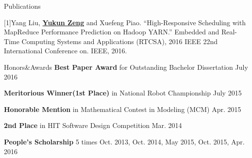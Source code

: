 \documentclass{resume} %
\begin{document}
\begin{rSection}{Publications}

{[1]Yang Liu, }\underline{\bf Yukun Zeng}{ and Xuefeng Piao. ``High-Responsive Scheduling with MapReduce Performance Prediction on Hadoop YARN.'' Embedded and Real-Time Computing Systems and Applications (RTCSA), 2016 IEEE 22nd International Conference on. IEEE, 2016.
}

\end{rSection}

\begin{rSection}{Honors\&Awards}
{\bf Best Paper Award}{ for Outstanding Bachelor Dissertation} \hfill {July 2016}
\vspace*{-0.4em}

{\bf Meritorious Winner(1st Place)}{ in National Robot Championship} \hfill {July 2015}
\vspace*{-0.4em}

{\bf Honorable Mention}{ in Mathematical Contest in Modeling (MCM)} \hfill {Apr. 2015}
\vspace*{-0.4em}

{\bf 2nd Place}{ in HIT Software Design Competition} \hfill {Mar. 2014} 
\vspace*{-0.4em}

{\bf People's Scholarship} 5 times \hfill {Oct. 2013, Oct. 2014, May 2015, Oct. 2015, Apr. 2016}
\vspace*{-0.4em}

\end{rSection}
\end{document}
